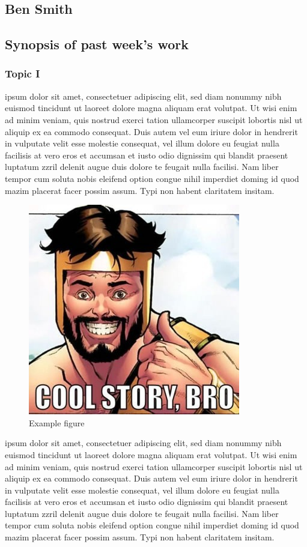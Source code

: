 \documentclass[12pt,journal]{IEEEtran}
\begin{document}
\subsection{Ben Smith}
	\subsection*{Synopsis of past week's work}
	\subsubsection{Topic I}
	ipsum dolor sit amet, consectetuer adipiscing elit, sed diam nonummy nibh 
	euismod tincidunt ut laoreet dolore magna aliquam erat volutpat. Ut wisi enim ad minim veniam, quis 
	nostrud exerci tation ullamcorper suscipit lobortis nisl ut aliquip ex ea commodo consequat. Duis 
	autem vel eum iriure dolor in hendrerit in vulputate velit esse molestie consequat, vel illum dolore 
	eu feugiat nulla facilisis at vero eros et accumsan et iusto odio dignissim qui blandit praesent luptatum 
	zzril delenit augue duis dolore te feugait nulla facilisi. Nam liber tempor cum soluta nobis eleifend option 
	congue nihil imperdiet doming id quod mazim placerat facer possim assum. Typi non habent claritatem insitam.
	\begin{figure}[H]
		\includegraphics[width=.48\textwidth]{cool-story-bro.jpg}
		\caption{Example figure}
	\end{figure}
	ipsum dolor sit amet, consectetuer adipiscing elit, sed diam nonummy nibh 
	euismod tincidunt ut laoreet dolore magna aliquam erat volutpat. Ut wisi enim ad minim veniam, quis 
	nostrud exerci tation ullamcorper suscipit lobortis nisl ut aliquip ex ea commodo consequat. Duis 
	autem vel eum iriure dolor in hendrerit in vulputate velit esse molestie consequat, vel illum dolore 
	eu feugiat nulla facilisis at vero eros et accumsan et iusto odio dignissim qui blandit praesent luptatum 
	zzril delenit augue duis dolore te feugait nulla facilisi. Nam liber tempor cum soluta nobis eleifend option 
	congue nihil imperdiet doming id quod mazim placerat facer possim assum. Typi non habent claritatem insitam.
\end{document}
